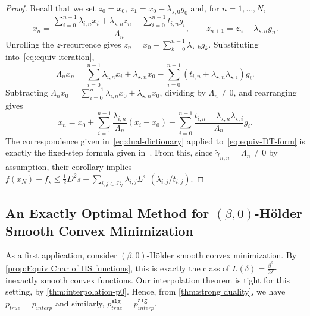 \documentclass[11pt, hidelinks]{article}
\numberwithin{equation}{section}
\theoremstyle{thmstyletwo}%
\numberwithin{equation}{section}
\newcommand{\Holder}{H\"older }
\newcommand{\Lleft}{L^{\leftarrow}}
\newcommand{\pAlg}{p^\mathtt{alg}}
\newcommand{\pPEP}[1]{p_{#1}}
\begin{document}
\begin{proof}
Recall that we set $z_0 = x_0$, $z_1 = x_0 - \lambda_{\star,0}g_0$ and, for $n = 1,\dots,N$,
\begin{equation}\label{eq:equiv-iteration}
    x_n = \frac{\sum_{i=0}^{n-1}\lambda_{i,n}x_i
        + \lambda_{\star,n}z_n
        - \sum_{i=0}^{n-1} t_{i,n}g_i}{\Lambda_n},
    \qquad z_{n+1} = z_n - \lambda_{\star,n}g_n.
\end{equation}
Unrolling the $z$-recurrence gives
$z_n = x_0 - \sum_{k=0}^{n-1}\lambda_{\star,k}g_k$. Substituting
into~\eqref{eq:equiv-iteration},
$$
    \Lambda_nx_n
    = \sum_{i=0}^{n-1}\lambda_{i,n}x_i
        + \lambda_{\star,n}x_0
        - \sum_{i=0}^{n-1}\left(t_{i,n} + \lambda_{\star,n}\lambda_{\star,i}\right)g_i.
$$
Subtracting $\Lambda_nx_0 = \sum_{i=0}^{n-1}\lambda_{i,n}x_0 + \lambda_{\star,n}x_0$, dividing by $\Lambda_n\neq 0$,
and rearranging gives
\begin{equation}\label{eq:equiv-DT-form}
    x_n = x_0
        + \sum_{i=1}^{n-1}\frac{\lambda_{i,n}}{\Lambda_n}(x_i - x_0)
        - \sum_{i=0}^{n-1}\frac{t_{i,n} + \lambda_{\star,n}\lambda_{\star,i}}{\Lambda_n}g_i.
\end{equation}
The correspondence given in~\eqref{eq:dual-dictionary} applied to~\eqref{eq:equiv-DT-form} is exactly the fixed-step
formula given in~\cite[Corollary 1]{constructive_approach}. From this, since
$\tilde\gamma_{n,n} = \Lambda_n \ne 0$ by assumption, their corollary implies $f(x_N) - f_\star \le \frac{1}{2}D^2s + \sum_{i,j \in \mathcal{I}_N^\star} \lambda_{i,j}\Lleft(\lambda_{i,j}/t_{i,j})$.
\end{proof}







\subsection{An Exactly Optimal Method for $(\beta,0)$-\Holder Smooth Convex Minimization}\label{subsec:BSD}

As a first application, consider $(\beta,0)$-\Holder smooth convex minimization.
By \cref{prop:Equiv Char of HS functions}, this is exactly the class of $L(\delta) = \frac{\beta^2}{2\delta}$-inexactly smooth convex functions. Our interpolation theorem is tight for this setting, by \cref{thm:interpolation-p0}. Hence, from \cref{thm:strong duality}, we have $\pPEP{true} = \pPEP{interp}$ and similarly, $\pAlg_{true}=\pAlg_{interp}$. 
\end{document}
